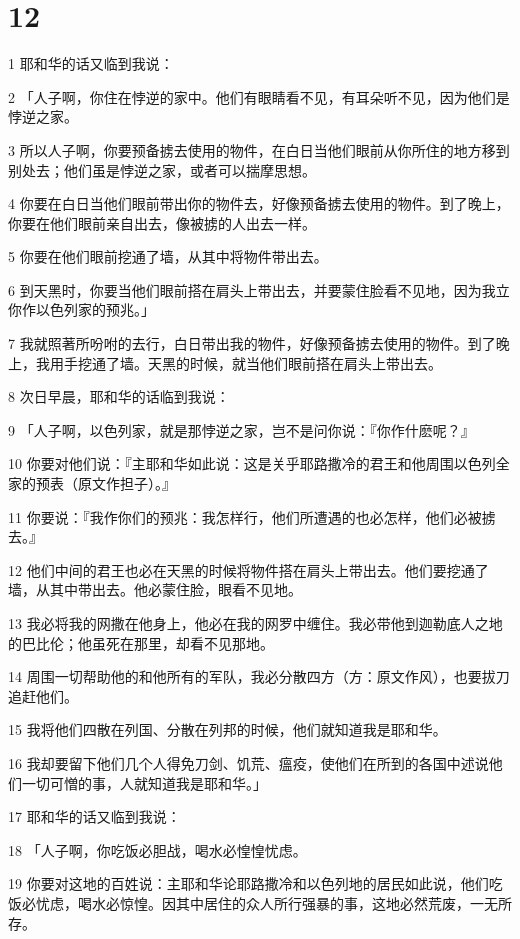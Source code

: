 \chapter{12}

\par 1 耶和华的话又临到我说：
\par 2 「人子啊，你住在悖逆的家中。他们有眼睛看不见，有耳朵听不见，因为他们是悖逆之家。
\par 3 所以人子啊，你要预备掳去使用的物件，在白日当他们眼前从你所住的地方移到别处去；他们虽是悖逆之家，或者可以揣摩思想。
\par 4 你要在白日当他们眼前带出你的物件去，好像预备掳去使用的物件。到了晚上，你要在他们眼前亲自出去，像被掳的人出去一样。
\par 5 你要在他们眼前挖通了墙，从其中将物件带出去。
\par 6 到天黑时，你要当他们眼前搭在肩头上带出去，并要蒙住脸看不见地，因为我立你作以色列家的预兆。」
\par 7 我就照著所吩咐的去行，白日带出我的物件，好像预备掳去使用的物件。到了晚上，我用手挖通了墙。天黑的时候，就当他们眼前搭在肩头上带出去。
\par 8 次日早晨，耶和华的话临到我说：
\par 9 「人子啊，以色列家，就是那悖逆之家，岂不是问你说：『你作什麽呢？』
\par 10 你要对他们说：『主耶和华如此说：这是关乎耶路撒冷的君王和他周围以色列全家的预表（原文作担子）。』
\par 11 你要说：『我作你们的预兆：我怎样行，他们所遭遇的也必怎样，他们必被掳去。』
\par 12 他们中间的君王也必在天黑的时候将物件搭在肩头上带出去。他们要挖通了墙，从其中带出去。他必蒙住脸，眼看不见地。
\par 13 我必将我的网撒在他身上，他必在我的网罗中缠住。我必带他到迦勒底人之地的巴比伦；他虽死在那里，却看不见那地。
\par 14 周围一切帮助他的和他所有的军队，我必分散四方（方：原文作风），也要拔刀追赶他们。
\par 15 我将他们四散在列国、分散在列邦的时候，他们就知道我是耶和华。
\par 16 我却要留下他们几个人得免刀剑、饥荒、瘟疫，使他们在所到的各国中述说他们一切可憎的事，人就知道我是耶和华。」
\par 17 耶和华的话又临到我说：
\par 18 「人子啊，你吃饭必胆战，喝水必惶惶忧虑。
\par 19 你要对这地的百姓说：主耶和华论耶路撒冷和以色列地的居民如此说，他们吃饭必忧虑，喝水必惊惶。因其中居住的众人所行强暴的事，这地必然荒废，一无所存。

